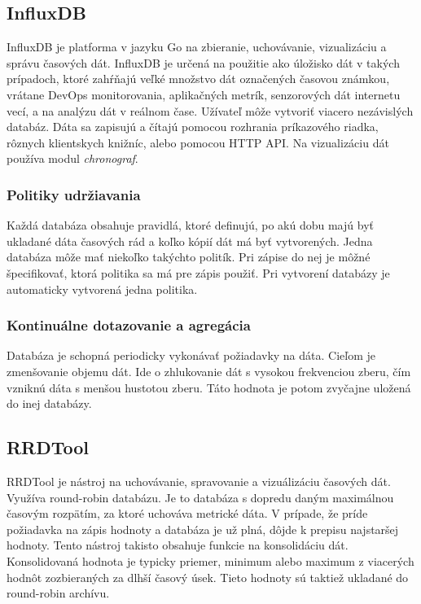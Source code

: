 \documentclass[11pt,final,oneside]{fithesis}
\begin{document}
\subsection{InfluxDB}
InfluxDB je platforma v jazyku Go na zbieranie, uchovávanie, vizualizáciu a správu časových dát. InfluxDB je určená na použitie ako úložisko dát v takých prípadoch, ktoré zahŕňajú veľké množstvo
dát označených časovou známkou, vrátane DevOps monitorovania, aplikačných metrík, senzorových dát internetu vecí, a na analýzu dát v reálnom čase.\cite{21} Užívateľ môže vytvoriť viacero nezávislých databáz. 
Dáta sa zapisujú a čítajú pomocou rozhrania príkazového riadka, rôznych klientskych knižníc, alebo pomocou HTTP API. Na vizualizáciu dát používa modul \emph{chronograf}.

\subsubsection{Politiky udržiavania}
Každá databáza obsahuje pravidlá, ktoré definujú, po akú dobu majú byť ukladané dáta časových rád a koľko kópií dát má byť vytvorených. Jedna databáza môže mať niekoľko takýchto politík. Pri zápise 
do nej je môžné špecifikovať, ktorá politika sa má pre zápis použiť. Pri vytvorení databázy je automaticky vytvorená jedna politika.

\subsubsection{Kontinuálne dotazovanie a agregácia}
Databáza je schopná periodicky vykonávať požiadavky na dáta. Cieľom je zmenšovanie objemu dát. Ide o zhlukovanie dát s vysokou frekvenciou zberu, čím vzniknú dáta s menšou hustotou zberu. Táto hodnota je 
potom zvyčajne uložená do inej databázy.

\subsection{RRDTool}
RRDTool je nástroj na uchovávanie, spravovanie a vizuálizáciu časových dát. Využíva round-robin databázu. Je to databáza s dopredu daným maximálnou časovým rozpätím, za ktoré uchováva metrické dáta.
V prípade, že príde požiadavka na zápis hodnoty a databáza je už plná, dôjde k prepisu najstaršej hodnoty. Tento nástroj takisto obsahuje funkcie na konsolidáciu dát. 
Konsolidovaná hodnota je typicky priemer, minimum alebo maximum z viacerých hodnôt zozbieraných za dlhší časový úsek. Tieto hodnoty sú taktiež ukladané do round-robin archívu.
\end{document}
